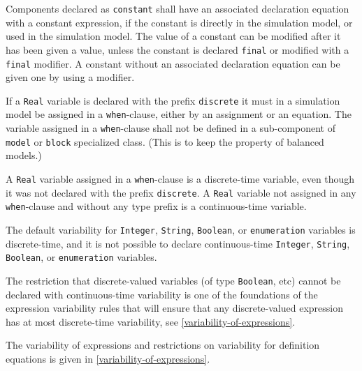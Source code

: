 Components declared as \lstinline!constant! shall have an associated declaration equation with a constant expression, if the constant is directly in the simulation model, or used in the simulation model.
The value of a constant can be modified after it has been given a value, unless the constant is declared \lstinline!final! or modified with a \lstinline!final! modifier.
A constant without an associated declaration equation can be given one by using a modifier.

If a \lstinline!Real! variable is declared with the prefix \lstinline!discrete! it must in a simulation model be assigned in a \lstinline!when!-clause, either by an assignment or an equation.
The variable assigned in a \lstinline!when!-clause shall not be defined in a sub-component of \lstinline!model! or \lstinline!block! specialized class.
(This is to keep the property of balanced models.)

A \lstinline!Real! variable assigned in a \lstinline!when!-clause is a discrete-time variable,
even though it was not declared with the prefix \lstinline!discrete!. A \lstinline!Real!
variable not assigned in any \lstinline!when!-clause and without any type prefix is
a continuous-time variable.

The default variability for \lstinline!Integer!, \lstinline!String!,
\lstinline!Boolean!, or \lstinline!enumeration!
variables is discrete-time, and it is not possible to declare
continuous-time \lstinline!Integer!, \lstinline!String!, \lstinline!Boolean!, or
\lstinline!enumeration! variables.

\begin{nonnormative}
The restriction that discrete-valued variables (of type \lstinline!Boolean!, etc) cannot be
declared with continuous-time variability is one of the foundations of the expression variability rules
that will ensure that any discrete-valued expression has at most discrete-time variability, see \cref{variability-of-expressions}.
\end{nonnormative}

The variability of expressions and restrictions on variability for
definition equations is given in \cref{variability-of-expressions}.

